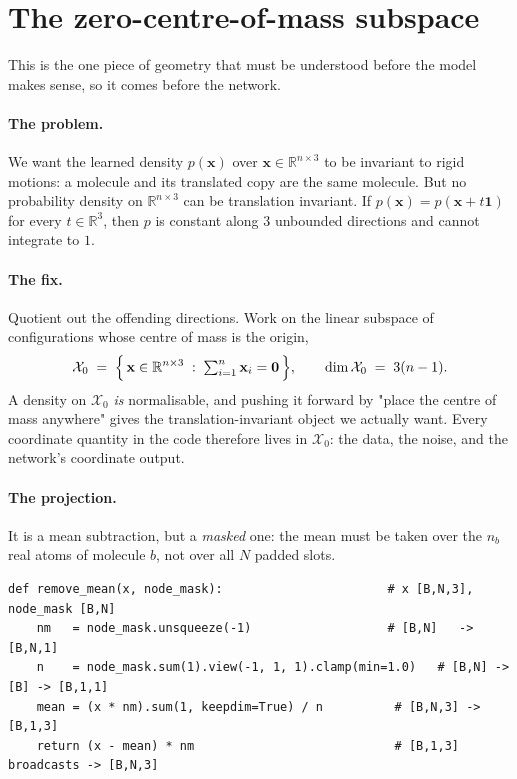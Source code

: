 \documentclass[11pt,a4paper]{article}
\newcommand{\code}[1]{\texttt{#1}}
\newcommand{\R}{\mathbb{R}}
\newcommand{\bx}{\mathbf{x}}
\begin{document}
\section{The zero-centre-of-mass subspace}
\label{sec:com}

This is the one piece of geometry that must be understood before the model makes
sense, so it comes before the network.

\paragraph{The problem.} We want the learned density $p(\bx)$ over
$\bx\in\R^{n\times 3}$ to be invariant to rigid motions: a molecule and its
translated copy are the same molecule. But no probability density on $\R^{n\times 3}$
can be translation invariant. If $p(\bx)=p(\bx+t\mathbf{1})$ for every
$t\in\R^3$, then $p$ is constant along $3$ unbounded directions and cannot
integrate to $1$.

\paragraph{The fix.} Quotient out the offending directions. Work on the linear
subspace of configurations whose centre of mass is the origin,
\begin{equation}
  \mathcal{X}_0 \;=\; \Bigl\{\, \bx \in \R^{n\times3} \;:\; \textstyle\sum_{i=1}^{n} \bx_i = \mathbf{0} \,\Bigr\},
  \qquad \dim \mathcal{X}_0 \;=\; 3(n-1).
\end{equation}
A density on $\mathcal{X}_0$ \emph{is} normalisable, and pushing it forward by
"place the centre of mass anywhere" gives the translation-invariant object we
actually want. Every coordinate quantity in the code therefore lives in
$\mathcal{X}_0$: the data, the noise, and the network's coordinate output.

\paragraph{The projection.} It is a mean subtraction, but a \emph{masked} one:
the mean must be taken over the $n_b$ real atoms of molecule $b$, not over all
$N$ padded slots.

\begin{lstlisting}[caption={\code{remove\_mean} --- projection onto $\mathcal{X}_0$ \code{diffusion.py}}]
def remove_mean(x, node_mask):                       # x [B,N,3], node_mask [B,N]
    nm   = node_mask.unsqueeze(-1)                   # [B,N]   -> [B,N,1]
    n    = node_mask.sum(1).view(-1, 1, 1).clamp(min=1.0)   # [B,N] -> [B] -> [B,1,1]
    mean = (x * nm).sum(1, keepdim=True) / n          # [B,N,3] -> [B,1,3]
    return (x - mean) * nm                            # [B,1,3] broadcasts -> [B,N,3]
\end{lstlisting}
\end{document}
